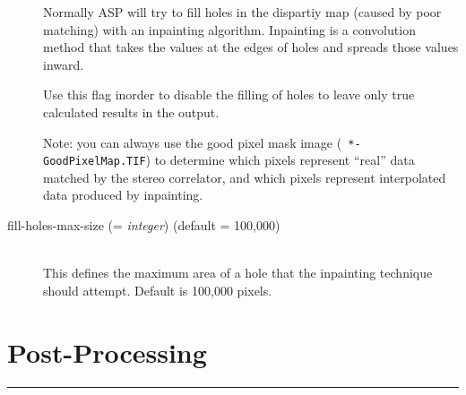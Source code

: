 \begin{description}
  Normally ASP will try to fill holes in the dispartiy map (caused by
  poor matching) with an inpainting algorithm. Inpainting is a
  convolution method that takes the values at the edges of holes and
  spreads those values inward.

  Use this flag inorder to disable the filling of holes to leave only
  true calculated results in the output.

  Note: you can always use the good pixel mask image ({\tt
    *-GoodPixelMap.TIF}) to determine which pixels represent ``real''
  data matched by the stereo correlator, and which pixels represent
  interpolated data produced by inpainting.

\item[fill-holes-max-size \textnormal{\small{(= \emph{integer})}} (default = 100,000)] \hfill \\
  This defines the maximum area of a hole that the inpainting
  technique should attempt. Default is 100,000 pixels.

\end{description}


\section{Post-Processing}
\hrule
\bigskip

